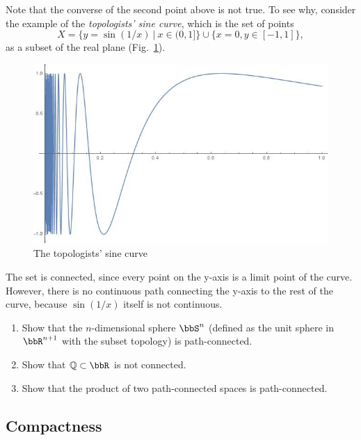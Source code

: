Note that the converse of the second point above is not true. To see why, consider the example of the \emph{topologists' sine curve}, which is the set of points
\begin{equation}
X = \{y = \sin(1/x) ~|~ x\in(0,1]\} \cup \{ x=0, y\in[-1,1] \},
\end{equation}
as a subset of the real plane (Fig.\ \ref{tsine}).
\begin{figure}[tp]
    \centering
    \includegraphics[scale=0.3]{figures/Top_sin.jpg}
    \caption{The topologists' sine curve}
    \label{tsine}
\end{figure}
The set is connected, since every point on the y-axis is a limit point of the curve. However, there is no continuous path connecting the y-axis to the rest of the curve, because $\sin(1/x)$ itself is not continuous.

\begin{xca}
\begin{enumerate}
    \item Show that the $n$-dimensional sphere $\bbS^n$ (defined as the unit sphere in $\bbR^{n+1}$ with the subset topology) is path-connected.
    \item Show that $\mathbb{Q}\subset\bbR $ is not connected.
    \item Show that the product of two path-connected spaces is path-connected.
\end{enumerate}
\end{xca}





\subsection{Compactness}


